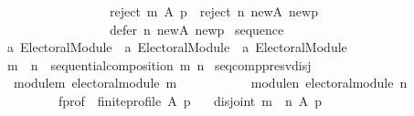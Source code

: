 \begin{isabellebody}
\ \ \ \ \ \ \ \ \ \ \ \ \ \ \ \ \ \ {\isacharparenleft}{\kern0pt}reject\ m\ A\ p{\isacharparenright}{\kern0pt}\ {\isasymunion}\ {\isacharparenleft}{\kern0pt}reject\ n\ new{\isacharunderscore}{\kern0pt}A\ new{\isacharunderscore}{\kern0pt}p{\isacharparenright}{\kern0pt}{\isacharcomma}{\kern0pt}\isanewline
\ \ \ \ \ \ \ \ \ \ \ \ \ \ \ \ \ \ defer\ n\ new{\isacharunderscore}{\kern0pt}A\ new{\isacharunderscore}{\kern0pt}p{\isacharparenright}{\kern0pt}{\isacharparenright}{\kern0pt}{\isachardoublequoteclose}\isanewline
\isanewline
{}\isamarkupfalse%
\ sequence\ {\isacharcolon}{\kern0pt}{\isacharcolon}{\kern0pt}\isanewline
\ \ {\isachardoublequoteopen}{\isacharprime}{\kern0pt}a\ Electoral{\isacharunderscore}{\kern0pt}Module\ {\isasymRightarrow}\ {\isacharprime}{\kern0pt}a\ Electoral{\isacharunderscore}{\kern0pt}Module\ {\isasymRightarrow}\ {\isacharprime}{\kern0pt}a\ Electoral{\isacharunderscore}{\kern0pt}Module{\isachardoublequoteclose}\isanewline
\ \ \ \ \ {\isacharparenleft}{\kern0pt}\ {\isachardoublequoteopen}{\isasymtriangleright}{\isachardoublequoteclose}\ {}{}{\isacharparenright}{\kern0pt}\ \isanewline
\ \ {\isachardoublequoteopen}m\ {\isasymtriangleright}\ n\ {\isacharequal}{\kern0pt}{\isacharequal}{\kern0pt}\ sequential{\isacharunderscore}{\kern0pt}composition\ m\ n{\isachardoublequoteclose}\isanewline
\isanewline
{}\isamarkupfalse%
\ seq{\isacharunderscore}{\kern0pt}comp{\isacharunderscore}{\kern0pt}presv{\isacharunderscore}{\kern0pt}disj{\isacharcolon}{\kern0pt}\isanewline
\ \ \ module{\isacharunderscore}{\kern0pt}m{\isacharcolon}{\kern0pt}\ {\isachardoublequoteopen}electoral{\isacharunderscore}{\kern0pt}module\ m{\isachardoublequoteclose}\ \isanewline
\ \ \ \ \ \ \ \ \ \ module{\isacharunderscore}{\kern0pt}n{\isacharcolon}{\kern0pt}\ {\isachardoublequoteopen}electoral{\isacharunderscore}{\kern0pt}module\ n{\isachardoublequoteclose}\ \isanewline
\ \ \ \ \ \ \ \ \ \ f{\isacharunderscore}{\kern0pt}prof{\isacharcolon}{\kern0pt}\ \ {\isachardoublequoteopen}finite{\isacharunderscore}{\kern0pt}profile\ A\ p{\isachardoublequoteclose}\isanewline
\ \ \ {\isachardoublequoteopen}disjoint{}\ {\isacharparenleft}{\kern0pt}{\isacharparenleft}{\kern0pt}m\ {\isasymtriangleright}\ n{\isacharparenright}{\kern0pt}\ A\ p{\isacharparenright}{\kern0pt}{\isachardoublequoteclose}\isanewline
%
\isadelimproof
%
\endisadelimproof
%
\isatagproof
{}\isamarkupfalse%
\ {\isacharminus}{\kern0pt}\isanewline

\end{isabellebody}
